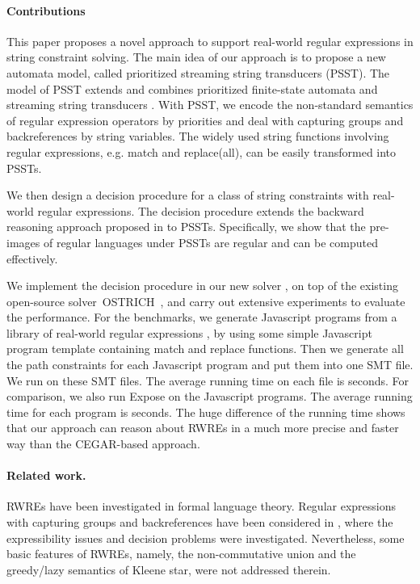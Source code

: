 \paragraph*{Contributions}
This paper proposes a novel approach to support real-world regular expressions in string constraint solving. The main idea of our approach is to propose a new automata model, called prioritized streaming string transducers (PSST). The model of PSST extends and combines prioritized finite-state automata \cite{BM17} and streaming string transducers \cite{AC10,AD11}. With PSST, we encode the non-standard semantics of regular expression operators by priorities and deal with capturing groups and backreferences by string variables. 
The widely used string functions involving regular expressions, e.g. match and replace(all), can be easily transformed into PSSTs. 

We then design a decision procedure for a class of string constraints with real-world regular expressions. The decision procedure extends the backward reasoning approach proposed in \cite{CHL+19} to PSSTs. Specifically, we show that the pre-images of regular languages under PSSTs are regular and can be computed effectively. 

We implement the decision procedure in our new solver \ostrich,
on top of the existing open-source solver~OSTRICH~\cite{CHL+19},
 and carry out extensive experiments to evaluate the performance. For the benchmarks, we generate  Javascript programs from a library of real-world regular expressions \cite{DMC+19}, by using some simple Javascript program template containing match and replace functions.  Then we generate all the path constraints for each Javascript program and put them into one SMT file. We run {\ostrich} on these SMT files. The average running time on each file is  seconds. For comparison, we also run Expose on the Javascript programs. The average running time for each program is  seconds. The huge difference of the running time shows that our approach can reason about RWREs in a much more precise and faster way than the CEGAR-based approach.


\paragraph*{Related work.}

RWREs have been investigated in formal language theory. Regular expressions with capturing groups and backreferences have been considered in \cite{CSY03,CN09,Freydenberger13,Schmid16,FS19}, where the expressibility issues and decision problems were investigated. Nevertheless, some basic features of RWREs, namely, the non-commutative union and the greedy/lazy semantics of Kleene star, were not addressed therein.

